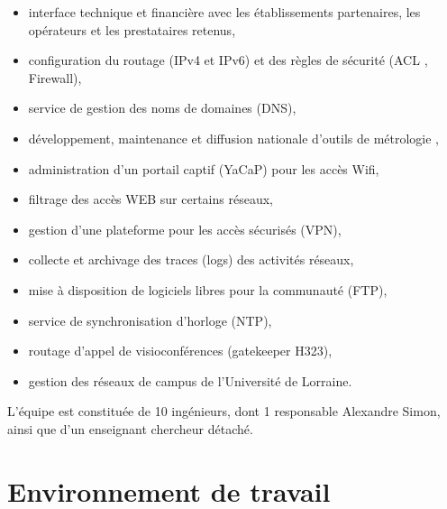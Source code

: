 \documentclass[a4paper,12pt,one side,titlepage]{report}
\begin{document}
\begin{itemize}
    \item interface technique et financière avec les établissements partenaires, 
    les opérateurs et les prestataires retenus,
    \item configuration du routage (IPv4 et IPv6) et des règles de sécurité (ACL , 
    Firewall),
    \item service de gestion des noms de domaines (DNS),
    \item développement, maintenance et diffusion nationale d’outils de métrologie ,
    \item administration d’un portail captif (YaCaP) pour les accès Wifi,
    \item filtrage des accès WEB sur certains réseaux,
    \item gestion d’une plateforme pour les accès sécurisés (VPN),
    \item collecte et archivage des traces (logs) des activités réseaux,
    \item mise à disposition de logiciels libres pour la communauté (FTP),
    \item service de synchronisation d’horloge (NTP),
    \item routage d’appel de visioconférences (gatekeeper H323),
    \item gestion des réseaux de campus de l’Université de Lorraine.
\end{itemize}                                                

L'équipe est constituée de 10 ingénieurs, dont 1 responsable Alexandre Simon, ainsi
que d'un enseignant chercheur détaché.


\section{Environnement de travail}

%
%
%
%
\end{document}

